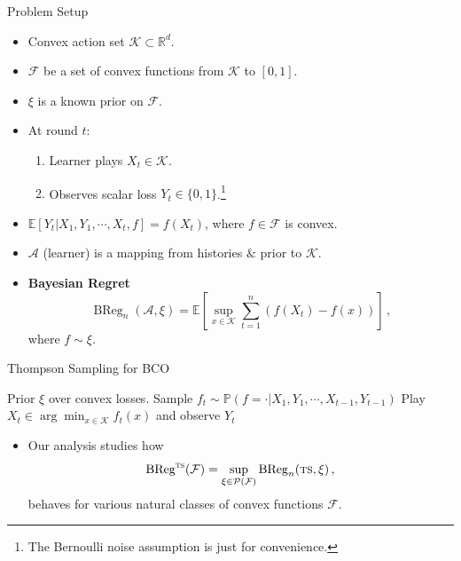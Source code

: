 \documentclass{beamer}
\newcommand{\BReg}{\operatorname{BReg}}
\newcommand{\E}{\mathbb{E}}
\newcommand{\PP}{\mathbb{P}}
\newcommand{\cK}{\mathcal{K}}
\newcommand{\cF}{\mathcal{F}}
\newcommand{\cA}{\mathcal{A}}
\newcommand{\cP}{\mathcal{P}}
\newcommand{\ts}{{\textsc{ts}}}
\begin{document}
\begin{frame}{Problem Setup}
    \begin{itemize}
        \item Convex action set \( \cK \subset \mathbb{R}^d \).
        \item $\cF$ be a set of convex functions from $\cK$ to $[0,1]$.
        \item $\xi$ is a known prior on $\cF$.
        \item<2-> At round \(t\):
              \begin{enumerate}
                  \item Learner plays \(X_t \in \cK\).
                  \item Observes scalar loss \( Y_t \in \{0,1\}\).\footnote{The Bernoulli noise assumption is just for convenience.}
              \end{enumerate}
        \item<3-> $\E\left[Y_t|X_1, Y_1, \cdots, X_t, f\right] = f(X_t)$, where $f \in \cF$ is convex.
        \item<4-> $\cA$ (learner) is a mapping from histories $\&$ prior to $\cK$.
        \item<5-> \textbf{Bayesian Regret}
              \[
                  \BReg_n(\cA, \xi) =
                  \E\left[
                      \sup_{x \in \cK}
                      \sum_{t=1}^n (f(X_t) - f(x))
                      \right]\,,
              \]
              where $f\sim \xi$.
    \end{itemize}
\end{frame}

\begin{frame}{Thompson Sampling for BCO}
    \begin{algorithm}[H]
        \caption{Thompson Sampling}
        \begin{algorithmic}[1]
            \State Prior \( \xi \) over convex losses.
            \State Sample \(f_t \sim \PP(f=\cdot|X_1, Y_1, \cdots, X_{t-1}, Y_{t-1})\)
            \State Play \( X_t \in \arg\min_{x\in\cK} f_t(x) \) and observe $Y_t$
            \EndFor
        \end{algorithmic}
    \end{algorithm}
    \begin{itemize}
        \item Our analysis studies how
              \[
                  \BReg^{\ts}(\cF) = \sup_{\xi \in \cP(\cF)} \BReg_n(\ts, \xi)\,,
              \]
              behaves for various natural classes of convex functions $\cF$.
    \end{itemize}
\end{frame}
\end{document}
